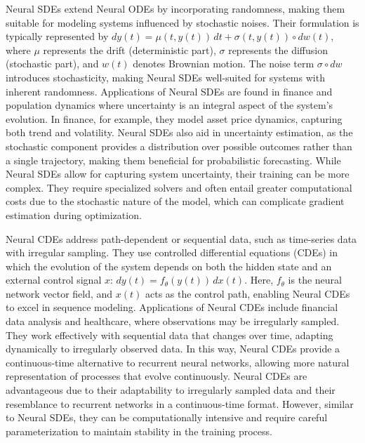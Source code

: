 Neural SDEs extend Neural ODEs by incorporating randomness, making them suitable for modeling systems influenced by stochastic noises. Their formulation is typically represented by \( dy(t) = \mu(t, y(t)) \, dt + \sigma(t, y(t)) \circ dw(t) \), where \( \mu \) represents the drift (deterministic part), \( \sigma \) represents the diffusion (stochastic part), and \( w(t) \) denotes Brownian motion. The noise term \( \sigma \circ dw \) introduces stochasticity, making Neural SDEs well-suited for systems with inherent randomness. Applications of Neural SDEs are found in finance \cite{wiese2020quant} and population dynamics \cite{mckendrick2022neural} where uncertainty is an integral aspect of the system's evolution. In finance, for example, they model asset price dynamics, capturing both trend and volatility. Neural SDEs also aid in uncertainty estimation, as the stochastic component provides a distribution over possible outcomes rather than a single trajectory, making them beneficial for probabilistic forecasting. While Neural SDEs allow for capturing system uncertainty, their training can be more complex. They require specialized solvers and often entail greater computational costs due to the stochastic nature of the model, which can complicate gradient estimation during optimization.

Neural CDEs \cite{kidger2020neural} address path-dependent or sequential data, such as time-series data with irregular sampling. They use controlled differential equations (CDEs) in which the evolution of the system depends on both the hidden state and an external control signal \(x\): \( dy(t) = f_\theta(y(t)) \, dx(t) \). Here, \( f_\theta \) is the neural network vector field, and \( x(t) \) acts as the control path, enabling Neural CDEs to excel in sequence modeling. Applications of Neural CDEs include financial data analysis \cite{kidger2020neural} and healthcare, where observations may be irregularly sampled. They work effectively with sequential data that changes over time, adapting dynamically to irregularly observed data. In this way, Neural CDEs provide a continuous-time alternative to recurrent neural networks, allowing more natural representation of processes that evolve continuously. Neural CDEs are advantageous due to their adaptability to irregularly sampled data and their resemblance to recurrent networks in a continuous-time format. However, similar to Neural SDEs, they can be computationally intensive and require careful parameterization to maintain stability in the training process.

